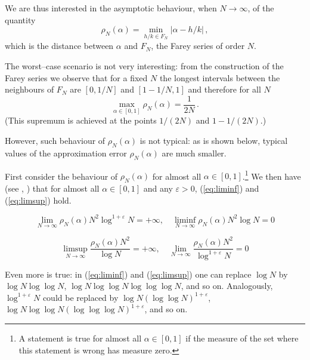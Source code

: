 \documentclass{esub2acm}
\begin{document}
We are thus interested in the asymptotic behaviour, when $N
\rightarrow \infty$,
of the quantity
 $$
\label{eq:dist}
\rho_N(\alpha) = \min_{h/k \in F_N} \left|\alpha - h/k\right|\, ,
$$
which is the distance between $\alpha$ and $F_N$, the Farey
series of order $N$.

The worst--case scenario is not very interesting: from the
construction of the Farey series
we observe that for a fixed $N$ the longest intervals between the
neighbours of  $F_N$
are $[0,1/N]$ and  $[1-1/N,1]$ and therefore for all $N$
\begin{equation}
\label{eq:max_error}
\max_{\alpha \in [0,1]} \rho_N(\alpha) = \frac{1}{2N}\, .
\end{equation}
(This supremum is achieved at the points $1/(2N)$ and $1-1/(2N)$.)

However, such behaviour of $\rho_N(\alpha)$ is not typical: as
is shown below,
typical values of the approximation error $\rho_N(\alpha)$ are
much smaller.

First consider the behaviour of $\rho_N(\alpha)$ for almost all
$\alpha \in [0,1]$.\footnote{ A statement is true
for almost all $\alpha \in [0,1]$ if the measure of the set where this
statement is wrong has measure zero.}
We then have (see \cite{KargaevZ}, \cite{Harman})
that for almost all $\alpha \in [0,1]$ and any $\varepsilon >0$,
(\ref{eq:liminf}) and (\ref{eq:limsup}) hold.

\begin{equation}
\label{eq:liminf}
\lim_{N\rightarrow\infty}\rho_N(\alpha) N^2 \log^{1+\varepsilon} N =
+ \infty, \quad
\liminf_{N\rightarrow\infty}  \rho_N(\alpha) N^2 \log N = 0
\end{equation}

\begin{equation}
\label{eq:limsup}
\limsup_{N\rightarrow\infty} \frac{ \rho_N(\alpha) N^2 }{ \log N } = +
\infty, \quad
\lim_{N\rightarrow\infty} \frac{ \rho_N(\alpha) N^2 }{
\log^{1+\varepsilon} N } = 0
\end{equation}

Even more is true: in (\ref{eq:liminf}) and (\ref{eq:limsup})
one can replace $\log N$ by $\log N \log \log N $, $\log N \log \log
N \log \log \log N$, and so on.
Analogously,   $\log^{1+\varepsilon} N$ could be replaced by
$\log N (\log \log N)^{1+\varepsilon} $, $\log N \log \log N (\log \log
\log N)^{1+\varepsilon}$, and so on.
\end{document}
